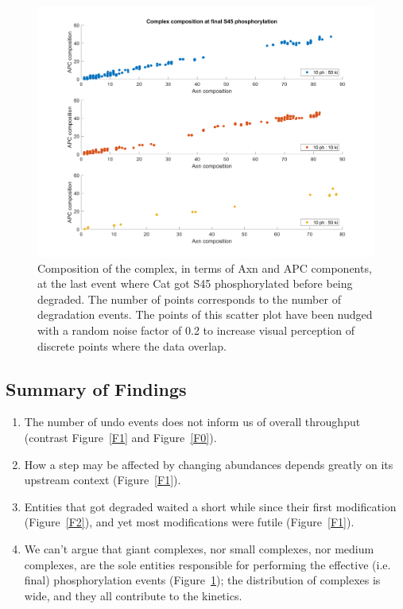 \begin{figure}[h]
  \centering
  \includegraphics[width=\columnwidth]{wnt/F6_complex_composition_final_S45.png}
  \caption{Composition of the complex, in terms of Axn and APC
    components, at the last event where Cat got S45 phosphorylated
    before being degraded. The number of points corresponds to the number of
    degradation events. The points of this scatter plot have
    been nudged with a random noise factor of 0.2 to increase visual
    perception of discrete points where the data overlap.}
  \label{F6}
\end{figure}


\subsection{Summary of Findings}

\begin{enumerate}
\item The number of undo events does not inform us of overall
  throughput (contrast Figure~\ref{F1} and Figure~\ref{F0}).
\item How a step may be affected by changing abundances depends
  greatly on its upstream context (Figure~\ref{F1}).
\item Entities that got degraded waited a short while since their
  first modification (Figure~\ref{F2}), and yet most modifications
  were futile (Figure~\ref{F1}).
\item We can't argue that giant complexes, nor small complexes, nor
  medium complexes, are the sole entities responsible for performing
  the effective (i.e. final) phosphorylation events  (Figure~\ref{F6}); %
  the distribution of complexes is wide, and they all contribute to
  the kinetics.
\end{enumerate}

